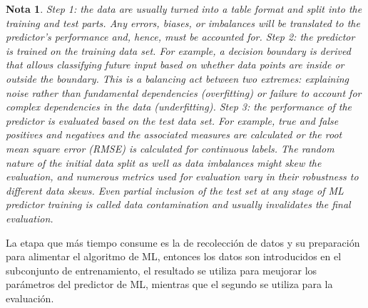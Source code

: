 \documentclass[12pt]{article}
\newtheorem{Note}{Nota}%
\begin{document}
\begin{Note}
Step 1: the data are usually turned into a table format and split into the training and test parts. Any errors, biases, or imbalances will be translated to the predictor’s performance and, hence, must be accounted for. Step 2: the predictor is trained on the training data set. For example, a decision boundary is derived that allows classifying future input based on whether data points are inside or outside the boundary. This is a balancing act between two extremes: explaining noise rather than fundamental dependencies (overfitting) or failure to account for complex dependencies in the data (underfitting). Step 3: the performance of the predictor is evaluated based on the test data set. For example, true and false positives and negatives and the associated measures are calculated or the root mean square error (RMSE) is calculated for continuous labels. The random nature of the initial data split as well as data imbalances might skew the evaluation, and numerous metrics used for evaluation vary in their robustness to different data skews. Even partial inclusion of the test set at any stage of ML predictor training is called data contamination and usually invalidates the final evaluation.

\end{Note}


La etapa que más tiempo consume es la de recolección de datos y su preparación para alimentar el algoritmo de ML, entonces los datos son introducidos en el subconjunto de entrenamiento, el resultado se utiliza para meujorar los parámetros del predictor de ML, mientras que el segundo se utiliza para la evaluación. 
\end{document}
